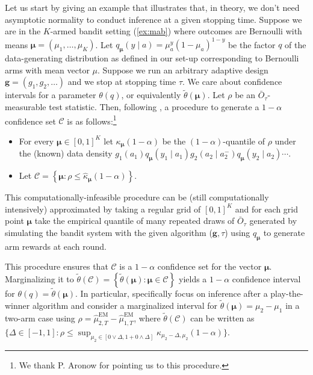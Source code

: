 Let us start by giving an example that illustrates that, in theory, we don't need asymptotic normality to conduct inference at a given stopping time. Suppose we are in the $K$-armed bandit setting (\cref{ex:mab}) where outcomes are Bernoulli with means $\bm{\mu} = (\mu_1,\ldots, \mu_K)$. Let $q_{\bm\mu}(y\mid a)=\mu_a^y(1-\mu_a)^{1-y}$ be the factor $q$ of the data-generating distribution as defined in our set-up corresponding to Bernoulli arms with mean vector $\mu$. Suppose we run an arbitrary adaptive design $\bm g = (g_1, g_2,\ldots)$ and we stop at stopping time $\tau$. We care about confidence intervals for a parameter $\theta(q)$, or equivalently $\widetilde \theta(\bm\mu)$. Let $\rho$ be an $\bar O_\tau$-measurable test statistic. Then, following \citet{wei1990statistical}, a procedure to generate a $1-\alpha$ confidence set $\mathcal{C}$ is as follows:\footnote{We thank P. Aronow for pointing us to this procedure.}
\begin{itemize}
    \item For every $\bm\mu\in[0,1]^K$ let $\kappa_{\bm\mu}(1-\alpha)$ be the $(1-\alpha)$-quantile of $\rho$ under
     the (known) data density $g_1(a_1)q_{\bm\mu}(y_1\mid a_1)g_2(a_2\mid a_2^-)q_{\bm\mu}(y_2\mid a_2)\cdots$. 
    \item Let $\mathcal{C} = \left\lbrace \bm\mu : \rho \leq \hat \kappa_{\bm\mu}(1-\alpha) \right\rbrace$.
\end{itemize}
This computationally-infeasible procedure can be (still computationally intensively) approximated by taking a regular grid of $[0,1]^K$ and for each grid point $\bm\mu$ take the empirical quantile of many repeated draws of $\bar O_\tau$ generated by simulating the bandit system with the given algorithm ($\bm g,\tau$) using $q_{\bm\mu}$ to generate arm rewards at each round.

This procedure ensures that $\mathcal{C}$ is a $1-\alpha$ confidence set for the vector $\bm\mu$. Marginalizing it to $\widetilde \theta(\mathcal{C}) = \left\lbrace  \widetilde \theta(\bm\mu) : \bm\mu \in \mathcal{C} \right\rbrace$ yields a $1-\alpha$ confidence interval for $\theta(q) = \widetilde \theta(\bm\mu)$. In particular, \citet{wei1990statistical} specifically focus on inference after a play-the-winner algorithm and consider a marginalized interval for $\widetilde\theta(\bm\mu)=\mu_2-\mu_1$ in a two-arm case using $\rho=\hat\mu^{\mathrm{EM}}_{2,T}-\hat\mu^{\mathrm{EM}}_{1,T}$, where $\widetilde \theta(\mathcal{C})$ can be written as $\{\Delta\in[-1,1]:\rho\leq\sup_{\mu_2\in[0\vee\Delta,1+0\wedge\Delta]}\kappa_{\mu_2-\Delta,\mu_2}(1-\alpha)\}$.

